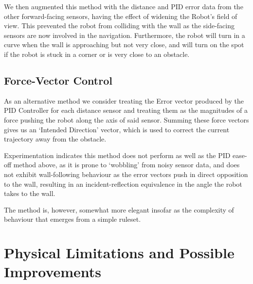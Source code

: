 \documentclass[11pt,a4wide]{article}
\begin{document}

We then augmented this method with the distance and PID error data from the other
forward-facing sensors, having the effect of widening the Robot's field of view.
This prevented the robot from colliding with the wall as the side-facing sensors 
are now involved in the navigation. Furthermore, the robot will turn in a curve 
when the wall is approaching but not very close, and will turn on the spot if the 
robot is stuck in a corner or is very close to an obstacle.

\subsection{Force-Vector Control}

As an alternative method we consider treating the Error vector produced by the
PID Controller for each distance sensor and treating them as the magnitudes of a 
force pushing the robot along the axis of said sensor. Summing these force vectors
gives us an `Intended Direction' vector, which is used to correct the current 
trajectory away from the obstacle.

Experimentation indicates this method does not perform as well as the PID ease-off 
method above, as it is prone to `wobbling' from noisy sensor data, and does not
exhibit wall-following behaviour as the error vectors push in direct opposition to 
the wall, resulting in an incident-reflection equivalence in the angle the robot
takes to the wall.

The method is, however, somewhat more elegant insofar as the complexity of behaviour 
that emerges from a simple ruleset.

\section{Physical Limitations and Possible Improvements}
\end{document}
